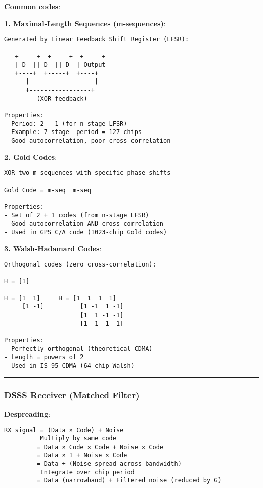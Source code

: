 \textbf{Common codes}:

\textbf{1. Maximal-Length Sequences (m-sequences)}:

\begin{verbatim}
Generated by Linear Feedback Shift Register (LFSR):

   +-----+  +-----+  +-----+
   | D  || D  || D  | Output
   +----+  +-----+  +----+
      |                  |
      +-----------------+
         (XOR feedback)

Properties:
- Period: 2 - 1 (for n-stage LFSR)
- Example: 7-stage  period = 127 chips
- Good autocorrelation, poor cross-correlation
\end{verbatim}

\textbf{2. Gold Codes}:

\begin{verbatim}
XOR two m-sequences with specific phase shifts

Gold Code = m-seq  m-seq

Properties:
- Set of 2 + 1 codes (from n-stage LFSR)
- Good autocorrelation AND cross-correlation
- Used in GPS C/A code (1023-chip Gold codes)
\end{verbatim}

\textbf{3. Walsh-Hadamard Codes}:

\begin{verbatim}
Orthogonal codes (zero cross-correlation):

H = [1]

H = [1  1]     H = [1  1  1  1]
     [1 -1]          [1 -1  1 -1]
                     [1  1 -1 -1]
                     [1 -1 -1  1]

Properties:
- Perfectly orthogonal (theoretical CDMA)
- Length = powers of 2
- Used in IS-95 CDMA (64-chip Walsh)
\end{verbatim}

\begin{center}\rule{0.5\linewidth}{0.5pt}\end{center}

\subsubsection{DSSS Receiver (Matched
Filter)}\label{dsss-receiver-matched-filter}

\textbf{Despreading}:

\begin{verbatim}
RX signal = (Data × Code) + Noise
          Multiply by same code
         = Data × Code × Code + Noise × Code
         = Data × 1 + Noise × Code
         = Data + (Noise spread across bandwidth)
          Integrate over chip period
         = Data (narrowband) + Filtered noise (reduced by G)
\end{verbatim}

